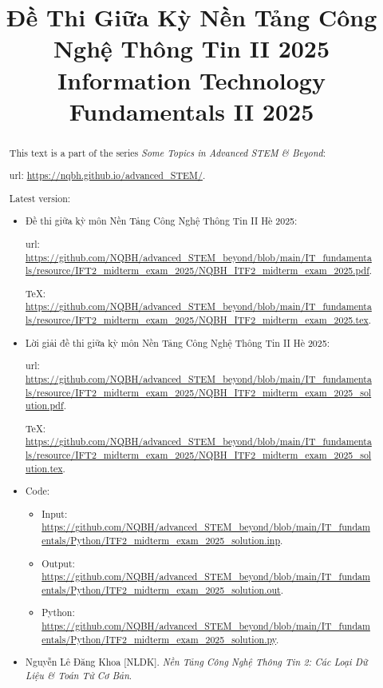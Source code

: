 \documentclass{article}
\title{Đề Thi Giữa Kỳ Nền Tảng Công Nghệ Thông Tin II 2025\\
	Information Technology Fundamentals II 2025}
\date{}
\begin{document}
\maketitle
\begin{abstract}
    This text is a part of the series {\it Some Topics in Advanced STEM \& Beyond}:
    
    {\sc url}: \url{https://nqbh.github.io/advanced_STEM/}.
    
    Latest version:
    \begin{itemize}
        \item Đề thi giữa kỳ môn Nền Tảng Công Nghệ Thông Tin II Hè 2025:
        
        {\sc url}: \url{https://github.com/NQBH/advanced_STEM_beyond/blob/main/IT_fundamentals/resource/IFT2_midterm_exam_2025/NQBH_ITF2_midterm_exam_2025.pdf}.
        
        \TeX: \url{https://github.com/NQBH/advanced_STEM_beyond/blob/main/IT_fundamentals/resource/IFT2_midterm_exam_2025/NQBH_ITF2_midterm_exam_2025.tex}.
        
        \item Lời giải đề thi giữa kỳ môn Nền Tảng Công Nghệ Thông Tin II Hè 2025:
        
        {\sc url}: \url{https://github.com/NQBH/advanced_STEM_beyond/blob/main/IT_fundamentals/resource/IFT2_midterm_exam_2025/NQBH_ITF2_midterm_exam_2025_solution.pdf}.
        
        \TeX: \url{https://github.com/NQBH/advanced_STEM_beyond/blob/main/IT_fundamentals/resource/IFT2_midterm_exam_2025/NQBH_ITF2_midterm_exam_2025_solution.tex}.
        \item Code:
        \begin{itemize}
            \item Input: \url{https://github.com/NQBH/advanced_STEM_beyond/blob/main/IT_fundamentals/Python/ITF2_midterm_exam_2025_solution.inp}.
            
            \item Output: \url{https://github.com/NQBH/advanced_STEM_beyond/blob/main/IT_fundamentals/Python/ITF2_midterm_exam_2025_solution.out}.
            
            \item Python: \url{https://github.com/NQBH/advanced_STEM_beyond/blob/main/IT_fundamentals/Python/ITF2_midterm_exam_2025_solution.py}.
        \end{itemize}
        
        \item {\sc Nguyễn Lê Đăng Khoa [NLDK]}. {\it Nền Tảng Công Nghệ Thông Tin 2: Các Loại Dữ Liệu \& Toán Tử Cơ Bản}.
    \end{itemize}
\end{abstract}
\end{document}
